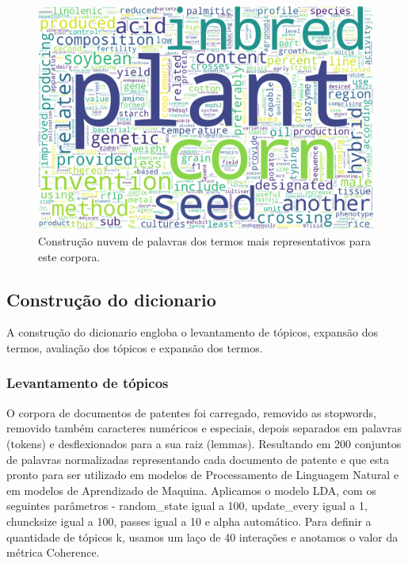 \begin{figure}[ht!]
	\centering
	\includegraphics[scale=0.3]{imagens/wordcloud_preprocess.png}
	\caption{Construção nuvem de palavras dos termos mais representativos para este corpora.
			 \label{wordcloud_pre_image}}
\end{figure}

\subsection{Construção do dicionario}

A construção do dicionario engloba o levantamento de tópicos, expansão dos termos, avaliação dos tópicos e expansão dos termos.

\subsubsection{Levantamento de tópicos}

O corpora de documentos de patentes foi carregado, removido as stopwords, removido também caracteres numéricos e especiais, depois separados em palavras (tokens) e desflexionados para a sua raiz (lemmas). Resultando em 200 conjuntos de palavras normalizadas representando cada documento de patente e que esta pronto para ser utilizado em modelos de Processamento de Linguagem Natural e em modelos de Aprendizado de Maquina.
Aplicamos o modelo LDA, com os seguintes parâmetros - random\_state igual a 100, update\_every igual a 1, chuncksize igual a 100, passes igual a 10 e alpha automático. Para definir a quantidade de tópicos k, usamos um laço de 40 interações e anotamos o valor da métrica Coherence.


